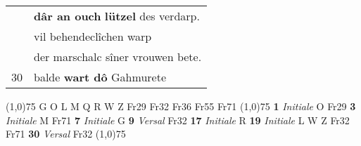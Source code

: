 \documentclass[8pt,a4paper,notitlepage]{article}
\begin{document}
\begin{table}[ht]
\begin{minipage}[t]{0.5\linewidth}
\begin{tabular}{rl}
 & \textbf{dâr an ouch} \textbf{lützel} des verdarp.\\ 
 & vil behendeclîchen warp\\ 
 & der marschalc sîner vrouwen bete.\\ 
30 & balde \textbf{wart dô} Gahmurete\\ 
\end{tabular}
\scriptsize
\line(1,0){75} \newline
G O L M Q R W Z Fr29 Fr32 Fr36 Fr55 Fr71 \newline
\line(1,0){75} \newline
\textbf{1} \textit{Initiale} O Fr29  \textbf{3} \textit{Initiale} M Fr71  \textbf{7} \textit{Initiale} G  \textbf{9} \textit{Versal} Fr32  \textbf{17} \textit{Initiale} R  \textbf{19} \textit{Initiale} L W Z Fr32 Fr71  \textbf{30} \textit{Versal} Fr32  \newline
\line(1,0){75} \newline

\end{minipage}
\end{table}
\end{document}
